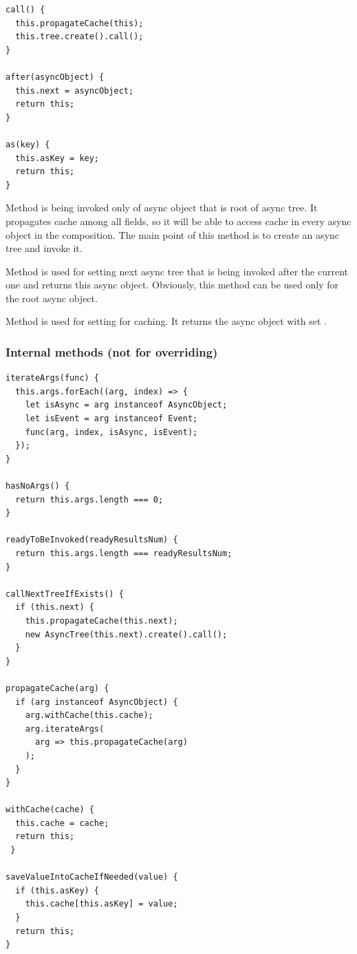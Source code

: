 \documentclass{article}
\newcommand{\cit}[1]{{\fontfamily{qcr}\selectfont{\textcolor{superdarkgray}{#1}}}}
\begin{document}
\begin{lstlisting}
call() {
  this.propagateCache(this);
  this.tree.create().call();
}

after(asyncObject) {
  this.next = asyncObject;
  return this;
}

as(key) {
  this.asKey = key;
  return this;
}
\end{lstlisting}

Method \cit{call} is being invoked only of async object that is root of async tree. It propagates cache among all fields, so it will be able to access cache in every async object in the composition. The main point of this method is to create an async tree and invoke it.

Method \cit{after} is used for setting next async tree that is being invoked after the current one and returns this async object. Obviously, this method can be used only for the root async object.

Method \cit{as} is used for setting \cit{key} for caching. It returns the async object with set \cit{key}.

\vspace*{10px}

\subsubsection{Internal methods (not for overriding)}

\begin{lstlisting}
iterateArgs(func) {
  this.args.forEach((arg, index) => {
    let isAsync = arg instanceof AsyncObject;
    let isEvent = arg instanceof Event;
    func(arg, index, isAsync, isEvent);
  });
}

hasNoArgs() {
  return this.args.length === 0;
}

readyToBeInvoked(readyResultsNum) {
  return this.args.length === readyResultsNum;
}

callNextTreeIfExists() {
  if (this.next) {
    this.propagateCache(this.next);
    new AsyncTree(this.next).create().call();
  }
}

propagateCache(arg) {
  if (arg instanceof AsyncObject) {
    arg.withCache(this.cache);
    arg.iterateArgs(
      arg => this.propagateCache(arg)
    );
  }
}

withCache(cache) {
  this.cache = cache;
  return this;
 }
 
saveValueIntoCacheIfNeeded(value) {
  if (this.asKey) {
    this.cache[this.asKey] = value;
  }
  return this;
}
\end{lstlisting}
\end{document}
